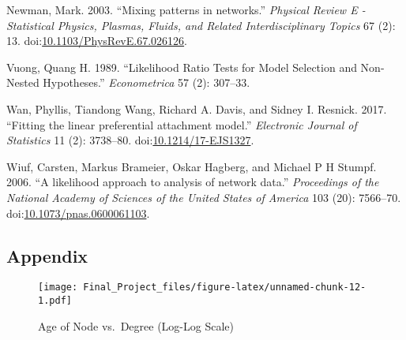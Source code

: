 \documentclass[]{elsarticle} %
\makeatletter
\def\maxwidth{\ifdim\Gin@nat@width>\linewidth\linewidth
\else\Gin@nat@width\fi}
\let\Oldincludegraphics\includegraphics
\renewcommand{\includegraphics}[1]{\Oldincludegraphics[width=\maxwidth]{#1}}
\makeatother
\begin{document}
\hypertarget{ref-Newman2003}{}
Newman, Mark. 2003. ``Mixing patterns in networks.'' \emph{Physical
Review E - Statistical Physics, Plasmas, Fluids, and Related
Interdisciplinary Topics} 67 (2): 13.
doi:\href{https://doi.org/10.1103/PhysRevE.67.026126}{10.1103/PhysRevE.67.026126}.

\hypertarget{ref-Vuong1989}{}
Vuong, Quang H. 1989. ``Likelihood Ratio Tests for Model Selection and
Non-Nested Hypotheses.'' \emph{Econometrica} 57 (2): 307--33.

\hypertarget{ref-Wan2017}{}
Wan, Phyllis, Tiandong Wang, Richard A. Davis, and Sidney I. Resnick.
2017. ``Fitting the linear preferential attachment model.''
\emph{Electronic Journal of Statistics} 11 (2): 3738--80.
doi:\href{https://doi.org/10.1214/17-EJS1327}{10.1214/17-EJS1327}.

\hypertarget{ref-Wiuf2006}{}
Wiuf, Carsten, Markus Brameier, Oskar Hagberg, and Michael P H Stumpf.
2006. ``A likelihood approach to analysis of network data.''
\emph{Proceedings of the National Academy of Sciences of the United
States of America} 103 (20): 7566--70.
doi:\href{https://doi.org/10.1073/pnas.0600061103}{10.1073/pnas.0600061103}.

\subsection{Appendix}\label{appendix}

\begin{figure}[htbp]
\centering
\texttt{[image: Final\_Project\_files/figure-latex/unnamed-chunk-12-1.pdf]}
\caption{Age of Node vs.~Degree (Log-Log Scale)}
\end{figure}
\end{document}
